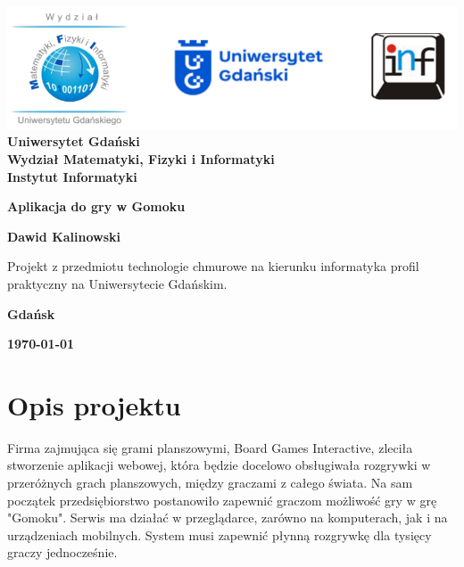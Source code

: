 \documentclass[12pt,a4paper]{article}
\newcommand{\hmwkTitle}{Aplikacja do gry w Gomoku} %
\newcommand{\hmwkDueDate}{\today} %
\newcommand{\hmwkAuthorName}{Dawid Kalinowski} %
\begin{document}
\begin{titlepage}
    \vfill
	\begin{center}
	\hspace*{-1cm}
	\vspace*{0.5cm}
    \includegraphics[scale=0.55]{imagens/loga.png}\\
	\textbf{Uniwersytet Gdański \\ [0.05cm]Wydział Matematyki, Fizyki i Informatyki \\ [0.05cm] Instytut Informatyki}

	\vspace{0.6cm}
	\vspace{4cm}
	{\huge \textbf{\hmwkTitle}}\vspace{8mm}
	
	{\large \textbf{\hmwkAuthorName}}\\[3cm]
	
		\hspace{.45\textwidth} %
	   \begin{minipage}{.5\textwidth}
	   Projekt z przedmiotu technologie chmurowe na kierunku informatyka profil praktyczny na Uniwersytecie Gdańskim.\\[0.1cm]
	  \end{minipage}
	  \vfill
	
	\textbf{Gdańsk}
	
	\textbf{\hmwkDueDate}
	\end{center}
	
\end{titlepage}

\newpage
\setcounter{secnumdepth}{5}
\tableofcontents
\newpage

\section{Opis projektu}
\label{sec:Project}

Firma zajmująca się grami planszowymi, Board Games Interactive, zleciła stworzenie aplikacji webowej, która będzie docelowo obsługiwała rozgrywki w przeróżnych grach planszowych, między graczami z całego świata. Na sam początek przedsiębiorstwo postanowiło zapewnić graczom możliwość gry w grę "Gomoku". Serwis ma działać w przeglądarce, zarówno na komputerach, jak i na urządzeniach mobilnych. System musi zapewnić płynną rozgrywkę dla tysięcy graczy jednocześnie.
\end{document}
